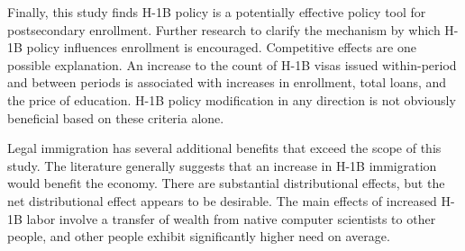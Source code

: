 \documentclass[review]{elsarticle}
\begin{document}

Finally, this study finds H-1B policy is a potentially effective policy tool for postsecondary enrollment.
Further research to clarify the mechanism by which H-1B policy influences enrollment is encouraged.
Competitive effects are one possible explanation.
An increase to the count of H-1B visas issued within-period and between periods is associated with increases in enrollment, total loans, and the price of education.
H-1B policy modification in any direction is not obviously beneficial based on these criteria alone.

Legal immigration has several additional benefits that exceed the scope of this study.
The literature generally suggests that an increase in H-1B immigration would benefit the economy\cite{bound2017understanding}.
There are substantial distributional effects, but the net distributional effect appears to be desirable.
The main effects of increased H-1B labor involve a transfer of wealth from native computer scientists to other people,
and other people exhibit significantly higher need on average.
\end{document}
